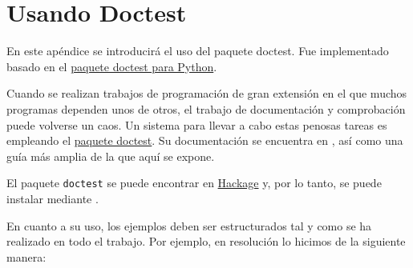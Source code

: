 \chapter{Usando Doctest}\label{aped.C}

En este apéndice se introducirá el uso del paquete doctest. Fue implementado
basado en el \href{https://docs.python.org/3/library/doctest.html}{paquete doctest para Python}.

Cuando se realizan trabajos de programación de gran extensión en el que muchos programas
dependen unos de otros, el trabajo de documentación y comprobación puede volverse un caos.
Un sistema para llevar a cabo estas penosas tareas es empleando el \href{https://hackage.haskell.org/package/doctest}{paquete doctest}. Su documentación se encuentra en \cite{DoctestDoc}, así como una guía más amplia de la que aquí se expone.


El paquete \texttt{doctest} se puede encontrar en \href{http://hackage.haskell.org/package/doctest}{Hackage} y, por lo tanto, se puede instalar mediante .

En cuanto a su uso, los ejemplos deben ser estructurados tal y como se ha realizado en todo el trabajo. Por ejemplo, en resolución lo hicimos de la siguiente manera:

